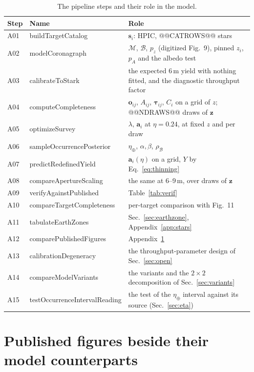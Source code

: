 \documentclass[11pt,a4paper]{article}
\begin{document}
\begin{table}[htbp]
\centering
\small
\begin{tabular}{llp{8.6cm}}
\toprule
\textbf{Step} & \textbf{Name} & \textbf{Role} \\
\midrule
A01 & buildTargetCatalog & $\mathbf{s}_i$: HPIC, @@CATROWS@@ stars \\
A02 & modelCoronagraph & $\mathcal{M}$, $\mathcal{B}$, $p_z$ (digitized Fig.~9), pinned $z_i$, $p_A$ and the albedo test \\
A03 & calibrateToStark & the expected 6\,m yield with nothing fitted, and the diagnostic throughput factor \\
A04 & computeCompleteness & $\mathbf{o}_{ij}$, $A_{ij}$, $\boldsymbol{\tau}_{ij}$, $C_i$ on a grid of $z$; @@NDRAWS@@ draws of $\mathbf{z}$ \\
A05 & optimizeSurvey & $\lambda$, $\mathbf{a}_i$ at $\eta = 0.24$, at fixed $z$ and per draw \\
A06 & sampleOccurrencePosterior & $\eta_\oplus$, $\alpha,\beta$, $\rho_\mathcal{B}$ \\
A07 & predictRedefinedYield & $\mathbf{a}_i(\eta)$ on a grid, $Y$ by Eq.~\eqref{eq:thinning} \\
A08 & compareApertureScaling & the same at 6--9\,m, over draws of $\mathbf{z}$ \\
A09 & verifyAgainstPublished & Table~\ref{tab:verif} \\
A10 & compareTargetCompleteness & per-target comparison with Fig.~11 \\
A11 & tabulateEarthZones & Sec.~\ref{sec:earthzone}, Appendix~\ref{app:stars} \\
A12 & comparePublishedFigures & Appendix~\ref{app:pairs} \\
A13 & calibrationDegeneracy & the throughput-parameter design of Sec.~\ref{sec:open} \\
A14 & compareModelVariants & the variants and the $2\times2$ decomposition of Sec.~\ref{sec:variants} \\
A15 & testOccurrenceIntervalReading & the test of the $\eta_\oplus$ interval against its source (Sec.~\ref{sec:eta}) \\
\bottomrule
\end{tabular}
\caption{The pipeline steps and their role in the model.}
\label{tab:steps}
\end{table}

\appendix
\section{Published figures beside their model counterparts}
\label{app:pairs}
\end{document}
